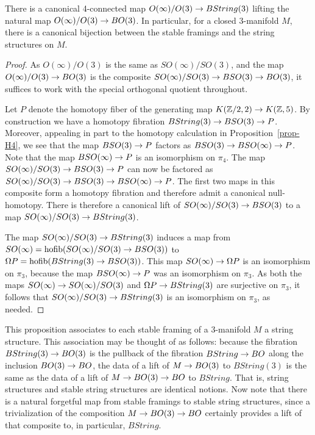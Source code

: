 \documentclass{amsart}
\begin{document}
\begin{proposition}
There is a canonical 4-connected map $O(\infty)/O(3) \rightarrow BString(3)$ lifting the natural map $O(\infty)/O(3) \rightarrow BO(3)$.  In particular, for a closed 3-manifold $M$, there is a canonical bijection between the stable framings and the string structures on $M$.
\end{proposition} 
\begin{proof}
As $O(\infty)/O(3)$ is the same as $SO(\infty)/SO(3)$, and the map $O(\infty)/O(3) \rightarrow BO(3)$ is the composite $SO(\infty)/SO(3) \rightarrow BSO(3) \rightarrow BO(3)$, it suffices to work with the special orthogonal quotient throughout.

Let $P$ denote the homotopy fiber of the generating map $K(\mathbb Z/2,2) \rightarrow K(\mathbb Z,5)$.  By construction we have a homotopy fibration $BString(3) \rightarrow BSO(3) \rightarrow P$.  Moreover, appealing in part to the homotopy calculation in Proposition~\ref{prop-H4}, we see that the map $BSO(3) \rightarrow P$ factors as $BSO(3) \rightarrow BSO(\infty) \rightarrow P$.  Note that the map $BSO(\infty) \rightarrow P$ is an isomorphism on $\pi_4$.  The map $SO(\infty)/SO(3) \rightarrow BSO(3) \rightarrow P$ can now be factored as $SO(\infty)/SO(3) \rightarrow BSO(3) \rightarrow BSO(\infty) \rightarrow P$.  The first two maps in this composite form a homotopy fibration and therefore admit a canonical null-homotopy.  There is therefore a canonical lift of $SO(\infty)/SO(3) \rightarrow BSO(3)$ to a map $SO(\infty)/SO(3) \rightarrow BString(3)$.

The map $SO(\infty)/SO(3) \rightarrow BString(3)$ induces a map from $SO(\infty) = \operatorname{hofib}(SO(\infty)/SO(3) \rightarrow BSO(3))$ to $\Omega P = \operatorname{hofib}(BString(3) \rightarrow BSO(3))$.  This map $SO(\infty) \rightarrow \Omega P$ is an isomorphism on $\pi_3$, because the map $BSO(\infty) \rightarrow P$ was an isomorphism on $\pi_3$.  As both the maps $SO(\infty) \rightarrow SO(\infty)/SO(3)$ and $\Omega P \rightarrow BString(3)$ are surjective on $\pi_3$, it follows that $SO(\infty)/SO(3) \rightarrow BString(3)$ is an isomorphism on $\pi_3$, as needed.
\end{proof}

This proposition associates to each stable framing of a 3-manifold $M$ a string structure.  This association may be thought of as follows: because the fibration $BString(3) \rightarrow BO(3)$ is the pullback of the fibration $BString \rightarrow BO$ along the inclusion $BO(3) \rightarrow BO$, the data of a lift of $M \rightarrow BO(3)$ to $BString(3)$ is the same as the data of a lift of $M \rightarrow BO(3) \rightarrow BO$ to $BString$.  That is, string structures and stable string structures are identical notions.  Now note that there is a natural forgetful map from stable framings to stable string structures, since a trivialization of the composition $M \rightarrow BO(3) \rightarrow BO$ certainly provides a lift of that composite to, in particular, $BString$.
\end{document}
